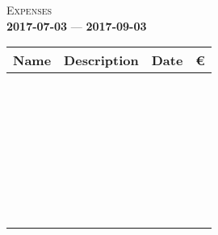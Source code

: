 \documentclass[12pt]{article}
\begin{document}

\begin{center}
  \large
  \textsc{Expenses}\\
  \small
  \textbf{2017-07-03} --- \textbf{2017-09-03}\\[0.5cm]

  \small
  \begin{tabular}{|K{4.0cm}|K{7.5cm}|K{2.5cm}|K{1.5cm}|}
    \hline
    \textbf{Name} & \textbf{Description} & \textbf{Date} & \euro \\ \hline
    \hline
    & & & \\[0.25cm] \hline
    & & & \\[0.25cm] \hline
    & & & \\[0.25cm] \hline
    & & & \\[0.25cm] \hline
    & & & \\[0.25cm] \hline
    & & & \\[0.25cm] \hline
    & & & \\[0.25cm] \hline
    & & & \\[0.25cm] \hline
    & & & \\[0.25cm] \hline
    & & & \\[0.25cm] \hline
    & & & \\[0.25cm] \hline
    & & & \\[0.25cm] \hline
    & & & \\[0.25cm] \hline
    & & & \\[0.25cm] \hline
    & & & \\[0.25cm] \hline
    & & & \\[0.25cm] \hline
    & & & \\[0.25cm] \hline
    & & & \\[0.25cm] \hline
    & & & \\[0.25cm] \hline
    & & & \\[0.25cm] \hline
    & & & \\[0.25cm] \hline
    & & & \\[0.25cm] \hline
    & & & \\[0.25cm] \hline
    & & & \\[0.25cm] \hline
    & & & \\[0.25cm] \hline
    & & & \\[0.25cm] \hline
    & & & \\[0.25cm] \hline
    & & & \\[0.25cm] \hline
    & & & \\[0.25cm] \hline
    & & & \\[0.25cm] \hline
    & & & \\[0.25cm] \hline
    & & & \\[0.25cm] \hline
  \end{tabular}
\end{center}
\end{document}
